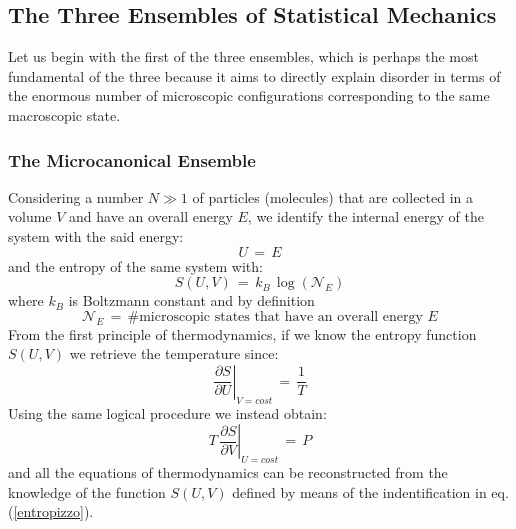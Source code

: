 \documentclass[10pt,a4paper]{article}
\begin{document}
\subsection{The Three Ensembles of Statistical Mechanics}
\label{tuttinsieme} Let us begin with the first of the three ensembles, which is perhaps the most fundamental of the three because it aims to directly explain disorder in terms of the enormous number of microscopic configurations corresponding  to the same macroscopic state.
\subsubsection{The Microcanonical Ensemble}
\label{insiememicro}Considering a number $N\gg 1$ of particles
(molecules) that are collected in a volume $V$ and have an overall energy $E$, we identify the internal energy of the system with the said energy:
\begin{equation}\label{energhia}
    U \, = \, E
\end{equation}
and the entropy of the same system with:
\begin{equation}\label{entropizzo}
    S\left(U,V\right) \, = \, k_B \, \log \left(\mathcal{N}_E\right)
\end{equation}
where $k_B$  is Boltzmann constant  and by definition
\begin{equation}\label{numerologo}
    \mathcal{N}_E \, = \, \# \text{microscopic states that have an overall energy $E$}
\end{equation}
From the first principle of thermodynamics, if we know the entropy function
$S\left(U,V\right)$ we retrieve the  temperature since:
\begin{equation}
\label{tempdaentrop}
    \left.\frac{\partial S}{\partial U}\right| _{V=cost} \, = \, \frac{1}{T}
\end{equation}
Using the same logical procedure we instead obtain:
\begin{equation}
\label{presdaentrop} T \,\left.\frac{\partial S}{\partial V}\right|
_{U=cost} \, = \, P
\end{equation}
and all the equations of  thermodynamics can be reconstructed
from the knowledge of the function $S\left(U,V\right)$  defined by means
of the indentification in eq.(\ref{entropizzo}).
\end{document}
